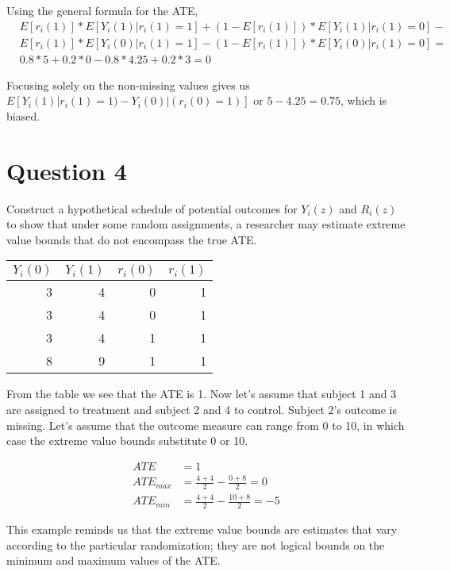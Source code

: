 \documentclass[11pt,notitlepage]{article}\usepackage[]{graphicx}\usepackage[]{color}
\begin{document}
Using the general formula for the ATE,
\begin{align*}
& E[r_i(1)] * E[Y_i(1)|r_i(1)=1] + (1-E[r_i(1)])*E[Y_i(1)|r_i(1)=0] - \\
& E[r_i(1)] * E[Y_i(0)|r_i(1)=1]-(1-E[r_i(1)])*E[Y_i(0)|r_i(1)=0] =\\
& 0.8 * 5 + 0.2 * 0 - 0.8*4.25 + 0.2*3 = 0
\end{align*}

Focusing solely on the non-missing values gives us $E[Y_i(1)|r_i(1)=1)-Y_i(0)|(r_i (0)=1)]$ or $5 - 4.25 = 0.75$, which is biased.

\section*{Question 4}
Construct a hypothetical schedule of potential outcomes for $Y_i(z)$ and $R_i(z)$ to show that under some random assignments, a researcher may estimate extreme value bounds that do not encompass the true ATE.

\begin{table}[H]
  \centering
    \begin{tabular}{rrrr}
    \toprule
    $Y_i(0)$ & $Y_i(1)$ & $r_i(0)$ & $r_i(1)$ \\
    \midrule
    3     & 4     & 0     & 1 \\
    3     & 4     & 0     & 1 \\
    3     & 4     & 1     & 1 \\
    8     & 9     & 1     & 1 \\
    \bottomrule
    \end{tabular}%
  \label{tab:addlabel}%
\end{table}%

From the table we see that the ATE is 1. Now let's assume that subject 1 and 3 are assigned to treatment and subject 2 and 4 to control. Subject 2’s outcome is missing. Let's assume that the outcome measure can range from 0 to 10, in which case the extreme value bounds substitute 0 or 10. 

\begin{align*}
ATE &= 1 \\
ATE_{max} &= \frac{4+4}{2} - \frac{0+8}{2} = 0 \\
ATE_{min} &= \frac{4+4}{2} - \frac{10+8}{2} = -5
\end{align*}

This example reminds us that the extreme value bounds are estimates that vary according to the particular randomization; they are not logical bounds on the minimum and maximum values of the ATE.
\end{document}
